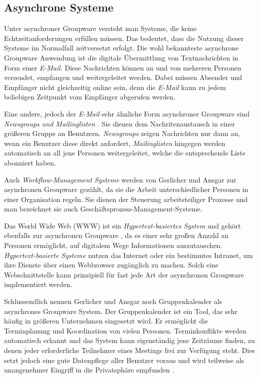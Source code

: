 \subsection{Asynchrone Systeme}

Unter asynchroner Groupware versteht man Systeme, die keine Echtzeitanforderungen erfüllen müssen. Das bedeutet, dass die Nutzung dieser Systeme im Normalfall zeitversetzt erfolgt. Die wohl bekannteste asynchrone Groupware Anwendung ist die digitale Übermittlung von Textnachrichten in Form einer \emph{E-Mail}. Diese Nachrichten können an und von mehreren Personen versendet, empfangen und weitergeleitet werden. Dabei müssen Absender und Empfänger nicht gleichzeitig online sein, denn die \emph{E-Mail} kann zu jedem beliebigen Zeitpunkt vom Empfänger abgerufen werden.

Eine andere, jedoch der \emph{E-Mail} sehr ähnliche Form asynchroner Groupware sind \emph{Newsgroups und Mailinglisten} \citep{Gerlicher:2007p241}. Sie dienen dem Nachritenaustausch in einer größeren Gruppe an Benutzern. \emph{Newsgroups} zeigen Nachrichten nur dann an, wenn ein Benutzer diese direkt anfordert, \emph{Mailinglisten} hingegen werden automatisch an all jene Personen weitergeleitet, welche die entsprechende Liste abonniert haben.

Auch \emph{Workflow-Management Systeme} werden von Gerlicher und Ansgar \citep{Gerlicher:2007p241} zur asynchronen Groupware gezählt, da sie die Arbeit unterschiedlicher Personen in einer Organisation regeln. Sie dienen der Steuerung arbeitsteiliger Prozesse und man bezeichnet sie auch Geschäftsprozess-Management-Systeme.

Das World Wide Web (WWW) ist ein \emph{Hypertext-basiertes System} und gehört ebenfalls zur asynchronen Groupware \citep{Gerlicher:2007p241}, da es einer sehr großen Anzahl an Personen ermöglicht, auf digitalem Wege Informationen auszutauschen. \emph{Hypertext-basierte Systeme} nutzen das Internet oder ein bestimmtes Intranet, um ihre Dienste über einen Webbrowser zugänglich zu machen. Solch eine Webschnittstelle kann prinzipiell für fast jede Art der asynchronen Groupware implementiert werden. 

Schlussendlich nennen Gerlicher und Ansgar noch Gruppenkalender als asynchrones Groupware System. Der Gruppenkalender ist ein Tool, das sehr häufig in größeren Unternehmen eingesetzt wird. Er ermöglicht die Terminplanung und Koordination von vielen Personen. Terminkonflikte werden automatisch erkannt und das System kann eigenständig jene Zeiträume finden, zu denen jeder erforderliche Teilnehmer eines Meetings frei zur Verfügung steht. Dies setzt jedoch eine gute Datenpflege aller Benutzer voraus und wird teilweise als unangenehmer Eingriff in die Privatsphäre empfunden \citep{Gerlicher:2007p241}.

